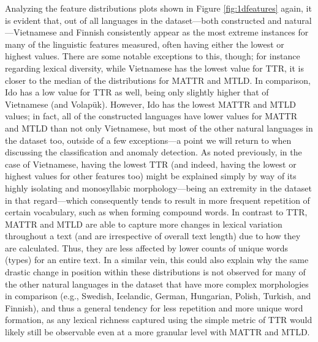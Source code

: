 \documentclass[12pt,a4paper]{article}
\numberwithin{figure}{section}
\numberwithin{table}{section}
\numberwithin{definition}{section}
\begin{document}
Analyzing the feature distributions plots shown in Figure \ref{fig:1dfeatures} again, it is evident that, out of all languages in the dataset---both constructed and natural---Vietnamese and Finnish consistently appear as the most extreme instances for many of the linguistic features measured, often having either the lowest or highest values. There are some notable exceptions to this, though; for instance regarding lexical diversity, while Vietnamese has the lowest value for TTR, it is closer to the median of the distributions for MATTR and MTLD. In comparison, Ido has a low value for TTR as well, being only slightly higher that of Vietnamese (and Volapük). However, Ido has the lowest MATTR and MTLD values; in fact, all of the constructed languages have lower values for MATTR and MTLD than not only Vietnamese, but most of the other natural languages in the dataset too, outside of a few exceptions---a point we will return to when discussing the classification and anomaly detection. As noted previously, in the case of Vietnamese, having the lowest TTR (and indeed, having the lowest or highest values for other features too) might be explained simply by way of its highly isolating and monosyllabic morphology---being an extremity in the dataset in that regard---which consequently tends to result in more frequent repetition of certain vocabulary, such as when forming compound words. In contrast to TTR, MATTR and MTLD are able to capture more changes in lexical variation throughout a text (and are irrespective of overall text length) due to how they are calculated. Thus, they are less affected by lower counts of unique words (types) for an entire text. In a similar vein, this could also explain why the same drastic change in position within these distributions is not observed for many of the other natural languages in the dataset that have more complex morphologies in comparison (e.g., Swedish, Icelandic, German, Hungarian, Polish, Turkish, and Finnish), and thus a general tendency for less repetition and more unique word formation, as any lexical richness captured using the simple metric of TTR would likely still be observable even at a more granular level with MATTR and MTLD.
\end{document}
